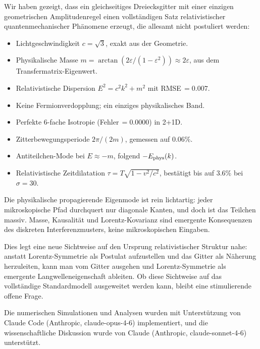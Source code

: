 \documentclass[twocolumn,showpacs,preprintnumbers,amsmath,amssymb]{revtex4-2}
\newcommand{\eps}{\varepsilon}
\begin{document}
Wir haben gezeigt, dass ein gleichseitiges Dreiecksgitter mit einer einzigen
geometrischen Amplitudenregel einen vollständigen Satz relativistischer
quantenmechanischer Phänomene erzeugt, die allesamt nicht postuliert werden:
\begin{itemize}
  \item Lichtgeschwindigkeit $c = \sqrt{3}$, exakt aus der Geometrie.
  \item Physikalische Masse $m = \arctan(2\eps/(1-\eps^2)) \approx 2\eps$,
        aus dem Transfermatrix-Eigenwert.
  \item Relativistische Dispersion $E^2 = c^2k^2 + m^2$ mit RMSE\,$= 0.007$.
  \item Keine Fermionverdopplung; ein einziges physikalisches Band.
  \item Perfekte 6-fache Isotropie (Fehler\,$= 0.0000$) in 2+1D.
  \item Zitterbewegungsperiode $2\pi/(2m)$, gemessen auf $0.06\%$.
  \item Antiteilchen-Mode bei $E \approx -m$, folgend $-E_{\rm phys}(k)$.
  \item Relativistische Zeitdilatation $\tau = T\sqrt{1 - v^2/c^2}$,
        bestätigt bis auf $3.6\%$ bei $\sigma = 30$.
\end{itemize}
Die physikalische propagierende Eigenmode ist rein lichtartig: jeder
mikroskopische Pfad durchquert nur diagonale Kanten, und doch ist das Teilchen
massiv.
Masse, Kausalität und Lorentz-Kovarianz sind emergente Konsequenzen des
diskreten Interferenzmusters, keine mikroskopischen Eingaben.

Dies legt eine neue Sichtweise auf den Ursprung relativistischer Struktur
nahe: anstatt Lorentz-Symmetrie als Postulat aufzustellen und das Gitter als
Näherung herzuleiten, kann man vom Gitter ausgehen und Lorentz-Symmetrie als
emergente Langwelleneigenschaft ableiten.
Ob diese Sichtweise auf das vollständige Standardmodell ausgeweitet werden kann,
bleibt eine stimulierende offene Frage.

\begin{acknowledgments}
Die numerischen Simulationen und Analysen wurden mit Unterstützung von
Claude Code (Anthropic, claude-opus-4-6) implementiert, und die
wissenschaftliche Diskussion wurde von Claude (Anthropic, claude-sonnet-4-6)
unterstützt.
\end{acknowledgments}
\end{document}
